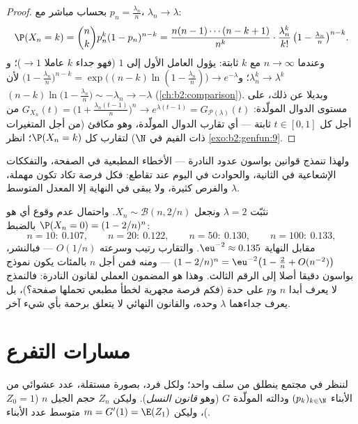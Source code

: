 \begin{proof}
بحساب مباشر مع $p_n = \frac{\lambda_n}{n}$، $\lambda_n
\to \lambda$:
\[
\P(X_n = k)
= \binom nk p_n^k(1 - p_n)^{n-k}
= \frac{n(n-1)\cdots(n-k+1)}{n^k}\cdot
\frac{\lambda_n^k}{k!}\,
\bigl(1 - \tfrac{\lambda_n}{n}\bigr)^{n-k} .
\]
وعندما $n \to \infty$ مع $k$ ثابتة: يؤول العامل الأول إلى $1$ (فهو
جداء $k$ عاملا $\to 1$)؛ و$\lambda_n^k \to \lambda^k$؛ و$\bigl(1 - \frac{\lambda_n}{n}\bigr)^{n-k} =
\exp\bigl((n-k)\ln(1 - \frac{\lambda_n}{n})\bigr) \to
e^{-\lambda}$ لأن $(n - k)\ln\bigl(1 - \frac{\lambda_n}{n}\bigr)
\sim -\lambda_n \to -\lambda$ (\cref{ch:b2:comparison}).
وبديلا عن ذلك، على مستوى الدوال المولّدة: $G_{X_n}(t) = \bigl(1 +
\frac{\lambda_n(t-1)}{n}\bigr)^n \to e^{\lambda(t - 1)} =
G_{\mathcal{P}(\lambda)}(t)$ من أجل كل $t \in [0, 1]$
ثابتة --- أي تقارب الدوال المولّدة، وهو مكافئ (من أجل المتغيرات ذات
القيم في $\N$) لتقارب كل $\P(X_n = k)$؛ انظر \cref{exo:b2:genfun:9}.
\end{proof}

\begin{remark}
ولهذا تنمذج قوانين بواسون عدود  النادرة --- الأخطاء المطبعية
في الصفحة، والتفككات الإشعاعية في الثانية، والحوادث في اليوم عند
تقاطع: فكل فرصة تكاد تكون مهملة، والفرص كثيرة، ولا يبقى في النهاية
إلا المعدل المتوسط $\lambda$.
\end{remark}

\begin{example}\label{ex:b2:genfun:poissonnumerics}
نثبّت $\lambda = 2$ ونجعل $X_n \sim \mathcal B(n, 2/n)$. واحتمال عدم وقوع أي  هو $\P(X_n = 0) = (1 - 2/n)^n$
بالضبط:
\[
n = 10:\ 0.107, \qquad
n = 20:\ 0.122, \qquad
n = 50:\ 0.130, \qquad
n = 100:\ 0.133,
\]
مقابل النهاية $\eu^{-2} \approx 0.135$. والتقارب رتيب وسرعته $O(1/n)$ --- فبالنشر،
$(1 -
2/n)^n = \eu^{-2}\bigl(1 - \tfrac2n + O(n^{-2})\bigr)$ --- ومنه فمن أجل $n$ بالمئات يكون نموذج بواسون دقيقا
أصلا إلى الرقم الثالث. وهذا هو المضمون العملي لقانون  النادرة:
فالنمذج لا يعرف أبدا $n$ و$p$ على حدة (فكم فرصة مجهرية لخطأ
مطبعي تحملها صفحة؟)، بل يعرف جداءهما $\lambda$ وحده، والقانون النهائي
لا يتعلق برحمة بأي شيء آخر.
\end{example}

\section{مسارات التفرع}

لننظر في مجتمع ينطلق من سلف واحد؛ ولكل فرد، بصورة مستقلة، عدد عشوائي
من الأبناء  $(p_k)_{k
\in \N}$ ودالته المولّدة $G$ (وهو \emph{قانون
النسل}). وليكن $Z_n$ حجم الجيل $n$ ($Z_0 =
1$)، وليكن $m = G'(1) = \E(Z_1)$
متوسط عدد الأبناء.


